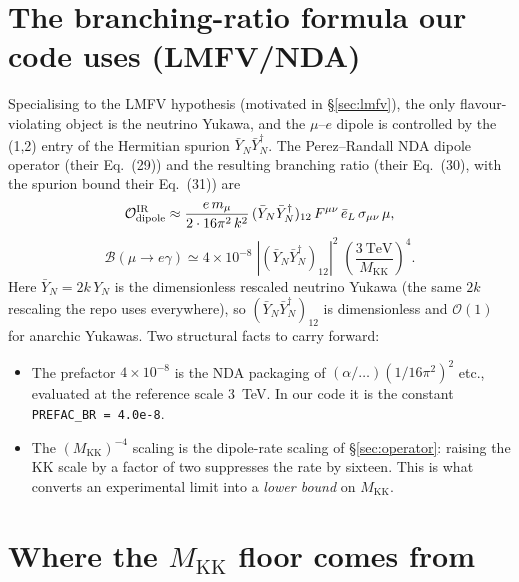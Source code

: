 \documentclass[11pt]{article}
\newcommand{\MKK}{M_{\mathrm{KK}}}
\newcommand{\YN}{Y_N}
\newcommand{\YNb}{\bar Y_N}
\newcommand{\spur}{(\YNb\YNb^\dagger)_{12}}
\newcommand{\BR}{\mathcal{B}}
\newcommand{\code}[1]{\texttt{#1}}
\theoremstyle{definition}
\begin{document}
\section{The branching-ratio formula our code uses (LMFV/NDA)}
\label{sec:brformula}

Specialising to the LMFV hypothesis (motivated in \S\ref{sec:lmfv}), the only
flavour-violating object is the neutrino Yukawa, and the $\mu$--$e$ dipole is
controlled by the (1,2) entry of the Hermitian spurion $\YNb\YNb^\dagger$. The
Perez--Randall NDA dipole operator (their Eq.~(29)) and the resulting
branching ratio (their Eq.~(30), with the spurion bound their Eq.~(31)) are
\begin{equation}
\mathcal{O}^{\rm IR}_{\rm dipole} \approx
   \frac{e\,m_\mu}{2\cdot 16\pi^2\,k^2}\,\spur\,
   F^{\mu\nu}\,\bar e_L\,\sigma_{\mu\nu}\,\mu,
\label{eq:prdipole}
\end{equation}
\begin{equation}
\boxed{\;\BR(\mu\to e\gamma) \simeq 4\times10^{-8}\;
   |\spur|^2\;\left(\frac{3\ \mathrm{TeV}}{\MKK}\right)^{4}.\;}
\label{eq:prBR}
\end{equation}
Here $\YNb = 2k\,\YN$ is the dimensionless rescaled neutrino Yukawa (the same
$2k$ rescaling the repo uses everywhere), so $\spur$ is dimensionless and
$\mathcal{O}(1)$ for anarchic Yukawas. Two structural facts to carry forward:
\begin{itemize}[leftmargin=1.4em]
\item The prefactor $4\times10^{-8}$ is the NDA packaging of
$(\alpha/\ldots)(1/16\pi^2)^2$ etc., evaluated at the reference scale $3$~TeV. In
our code it is the constant \code{PREFAC\_BR = 4.0e-8}.
\item The $(\MKK)^{-4}$ scaling is the dipole-rate scaling of
\S\ref{sec:operator}: raising the KK scale by a factor of two suppresses the rate
by sixteen. This is what converts an experimental limit into a \emph{lower bound}
on $\MKK$.
\end{itemize}

\section{Where the $\MKK$ floor comes from}
\label{sec:floor}
\end{document}
